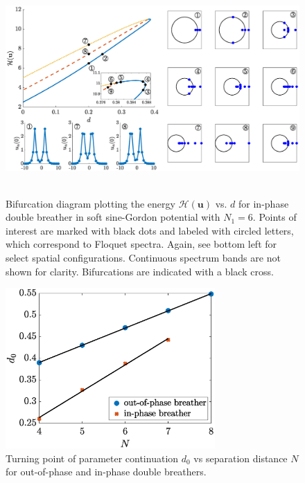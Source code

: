 \documentclass[12pt,reqno]{amsart}
\newcommand{\uvec}{\mathbf{u}}
\theoremstyle{definition}
\begin{document}
\begin{figure}
	\hbox{
	\hspace{-2cm}
	\includegraphics[width=20cm]{bifdiagSGinphaseN6.eps} 
	}
	\caption{Bifurcation diagram plotting the energy $\mathcal{H}(\uvec)$ vs. $d$ for in-phase double breather in soft sine-Gordon potential with $N_1 = 6$. Points of interest are marked with black dots and labeled with circled letters, which correspond to Floquet spectra. 
	Again, see bottom left for select spatial configurations.
	Continuous spectrum bands are not shown for clarity. Bifurcations are indicated with a black cross. }
	\label{fig:bifdiagSGip1}
\end{figure}

\begin{figure}
	\begin{center}
	\includegraphics[width=8cm]{doubled0vsN.eps} 
	\end{center}
	\caption{Turning point of parameter continuation $d_0$ vs separation distance $N$ for out-of-phase and in-phase double breathers.}
	\label{fig:SGd0}
\end{figure}
\end{document}

